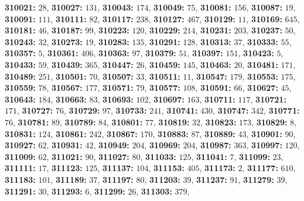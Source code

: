 \textsf{\bfseries 310021:} $28$, \textsf{\bfseries 310027:} $131$, \textsf{\bfseries 310043:} $174$, \textsf{\bfseries 310049:} $75$, \textsf{\bfseries 310081:} $156$, \textsf{\bfseries 310087:} $19$, \textsf{\bfseries 310091:} $111$, \textsf{\bfseries 310111:} $82$, \textsf{\bfseries 310117:} $238$, \textsf{\bfseries 310127:} $467$, \textsf{\bfseries 310129:} $11$, \textsf{\bfseries 310169:} $645$, \textsf{\bfseries 310181:} $46$, \textsf{\bfseries 310187:} $99$, \textsf{\bfseries 310223:} $120$, \textsf{\bfseries 310229:} $214$, \textsf{\bfseries 310231:} $203$, \textsf{\bfseries 310237:} $50$, \textsf{\bfseries 310243:} $32$, \textsf{\bfseries 310273:} $19$, \textsf{\bfseries 310283:} $135$, \textsf{\bfseries 310291:} $128$, \textsf{\bfseries 310313:} $37$, \textsf{\bfseries 310333:} $55$, \textsf{\bfseries 310357:} $5$, \textsf{\bfseries 310361:} $406$, \textsf{\bfseries 310363:} $97$, \textsf{\bfseries 310379:} $51$, \textsf{\bfseries 310397:} $151$, \textsf{\bfseries 310423:} $5$, \textsf{\bfseries 310433:} $59$, \textsf{\bfseries 310439:} $365$, \textsf{\bfseries 310447:} $26$, \textsf{\bfseries 310459:} $145$, \textsf{\bfseries 310463:} $20$, \textsf{\bfseries 310481:} $171$, \textsf{\bfseries 310489:} $251$, \textsf{\bfseries 310501:} $70$, \textsf{\bfseries 310507:} $33$, \textsf{\bfseries 310511:} $11$, \textsf{\bfseries 310547:} $179$, \textsf{\bfseries 310553:} $175$, \textsf{\bfseries 310559:} $78$, \textsf{\bfseries 310567:} $177$, \textsf{\bfseries 310571:} $79$, \textsf{\bfseries 310577:} $108$, \textsf{\bfseries 310591:} $66$, \textsf{\bfseries 310627:} $45$, \textsf{\bfseries 310643:} $184$, \textsf{\bfseries 310663:} $83$, \textsf{\bfseries 310693:} $102$, \textsf{\bfseries 310697:} $163$, \textsf{\bfseries 310711:} $117$, \textsf{\bfseries 310721:} $171$, \textsf{\bfseries 310727:} $76$, \textsf{\bfseries 310729:} $97$, \textsf{\bfseries 310733:} $241$, \textsf{\bfseries 310741:} $430$, \textsf{\bfseries 310747:} $342$, \textsf{\bfseries 310771:} $76$, \textsf{\bfseries 310781:} $89$, \textsf{\bfseries 310789:} $84$, \textsf{\bfseries 310801:} $77$, \textsf{\bfseries 310819:} $32$, \textsf{\bfseries 310823:} $173$, \textsf{\bfseries 310829:} $8$, \textsf{\bfseries 310831:} $124$, \textsf{\bfseries 310861:} $242$, \textsf{\bfseries 310867:} $170$, \textsf{\bfseries 310883:} $87$, \textsf{\bfseries 310889:} $43$, \textsf{\bfseries 310901:} $90$, \textsf{\bfseries 310927:} $62$, \textsf{\bfseries 310931:} $42$, \textsf{\bfseries 310949:} $204$, \textsf{\bfseries 310969:} $204$, \textsf{\bfseries 310987:} $363$, \textsf{\bfseries 310997:} $120$, \textsf{\bfseries 311009:} $62$, \textsf{\bfseries 311021:} $90$, \textsf{\bfseries 311027:} $80$, \textsf{\bfseries 311033:} $125$, \textsf{\bfseries 311041:} $7$, \textsf{\bfseries 311099:} $23$, \textsf{\bfseries 311111:} $17$, \textsf{\bfseries 311123:} $125$, \textsf{\bfseries 311137:} $104$, \textsf{\bfseries 311153:} $405$, \textsf{\bfseries 311173:} $2$, \textsf{\bfseries 311177:} $610$, \textsf{\bfseries 311183:} $101$, \textsf{\bfseries 311189:} $37$, \textsf{\bfseries 311197:} $80$, \textsf{\bfseries 311203:} $39$, \textsf{\bfseries 311237:} $91$, \textsf{\bfseries 311279:} $39$, \textsf{\bfseries 311291:} $30$, \textsf{\bfseries 311293:} $6$, \textsf{\bfseries 311299:} $26$, \textsf{\bfseries 311303:} $379$, 
